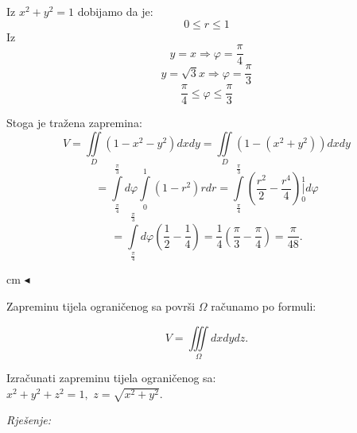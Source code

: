 \documentclass[a4paper,11pt]{article}
\begin{document}
Iz $x^2 + y^2 =1 $ dobijamo da je:
 $$0\leq r \leq 1$$
 Iz $$y=x \Rightarrow \varphi = \frac{\pi}{4}$$
 $$y=\sqrt{3}x \Rightarrow \varphi = \frac{\pi}{3}$$
  $$\frac{\pi}{4}\leq \varphi \leq \frac{\pi}{3}$$

 Stoga je tražena zapremina:
$$ V  	=\iint\limits_{ D }\left( 1-x^{2}-y^{2}\right) dx dy = 	\iint\limits_{ D }\left( 1-(x^{2}+y^{2})\right) dx dy$$ 	   
  	$$ =\int\limits_{\frac{\pi}{4}}^{\frac{\pi}{3} } d\varphi \int\limits_{0}^{1}( 1-r^{2})r dr =\int\limits_{\frac{\pi}{4}}^{\frac{\pi}{3} }\left(\frac{r^{2}  }{2} - \frac{r^{4}  }{4} \right) \underset{0}{\overset{1 }{ \bigg\vert}}d\varphi $$
  	$$ =\int\limits_{\frac{\pi}{4}}^{\frac{\pi}{3} }d\varphi \left(\frac{1}{2} - \frac{1}{4}\right) = \frac{1}{4} \left(\frac{\pi}{3} - \frac{\pi}{4}\right) = \frac{\pi}{48}  .$$ 

 cm $\blacktriangleleft$ \\
\newpage
\begin{center}
\end{center}
\begin{tcolorbox}[enhanced,attach boxed title to top center={yshift=-3mm,yshifttext=-1mm},
  colback=yellow!15!white,colframe=red!755!yellow,colbacktitle=brown!90!white,
  title=Zapremina,fonttitle=\bfseries,
  boxed title style={size=small,colframe=red!50!black} ]
   Zapreminu tijela ograničenog sa površi $\Omega$ računamo   po formuli:

$$ V=\iiint\limits_\Omega dx dy dz.$$ 
\end{tcolorbox}
\begin{tcolorbox}[colback=brown!35!white,colframe=white!75!white,title= $$\bullet \bullet \bullet$$]
         \begin{zadatak}
Izračunati zapreminu tijela ograničenog sa:\\
$  x^2 + y^2 + z^2 = 1,$ $z =\sqrt{ x^2 + y^2} .$
\end{zadatak}
\end{tcolorbox}
\emph{Rješenje: }
\end{document}
